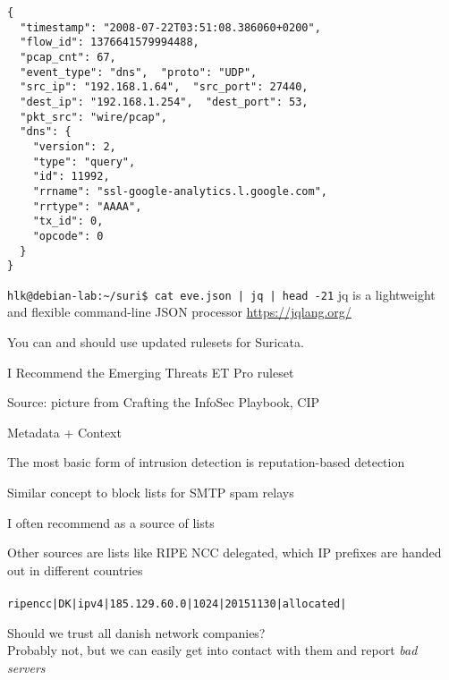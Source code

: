 \documentclass[Screen16to9,17pt]{foils}
\begin{document}
\begin{verbatim}
{
  "timestamp": "2008-07-22T03:51:08.386060+0200",
  "flow_id": 1376641579994488,
  "pcap_cnt": 67,
  "event_type": "dns",  "proto": "UDP",
  "src_ip": "192.168.1.64",  "src_port": 27440,
  "dest_ip": "192.168.1.254",  "dest_port": 53,
  "pkt_src": "wire/pcap",
  "dns": {
    "version": 2,
    "type": "query",
    "id": 11992,
    "rrname": "ssl-google-analytics.l.google.com",
    "rrtype": "AAAA",
    "tx_id": 0,
    "opcode": 0
  }
}
\end{verbatim}

\begin{list2}
\item
\verb+hlk@debian-lab:~/suri$ cat eve.json | jq | head -21+
jq is a lightweight and flexible command-line JSON processor \url{https://jqlang.org/}
\end{list2}





You can and should use updated rulesets for Suricata.

I Recommend the Emerging Threats ET Pro ruleset





Source: picture from Crafting the InfoSec Playbook, CIP

Metadata + Context




\begin{list2}
\item The most basic form of intrusion detection is reputation-based detection
\item Similar concept to block lists for SMTP spam relays
\item I often recommend  as a source of lists
\item Other sources are lists like RIPE NCC delegated, which IP prefixes are handed out in different countries\\
\\
\verb+ripencc|DK|ipv4|185.129.60.0|1024|20151130|allocated|+
\item Should we trust all danish network companies?\\
Probably not, but we can easily get into contact with them and report \emph{bad servers}
\end{list2}
\end{document}
